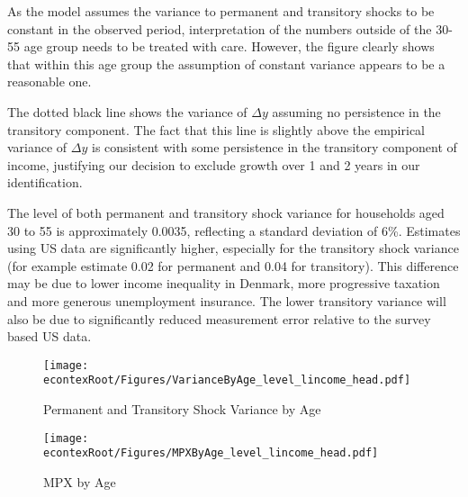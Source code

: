 \documentclass[titlepage]{\econtex}\newcommand{\texname}{ConsumptionHeterogeneity}
\begin{document}
As the model assumes the variance to permanent and transitory shocks to be constant in the observed period, interpretation of the numbers outside of the 30-55 age group needs to be treated with care. However, the figure clearly shows that within this age group the assumption of constant variance appears to be a reasonable one.

The dotted black line shows the variance of $\Delta y$ assuming no persistence in the transitory component. The fact that this line is slightly above the empirical variance of $\Delta y$ is consistent with some persistence in the transitory component of income, justifying our decision to exclude growth over 1 and 2 years in our identification.

The level of both permanent and transitory shock variance for households aged 30 to 55 is approximately 0.0035, reflecting a standard deviation of 6\%. Estimates using US data are significantly higher, especially for the transitory shock variance (for example \cite{carroll_nature_1997} estimate 0.02 for permanent and 0.04 for transitory). This difference may be due to lower income inequality in Denmark, more progressive taxation and more generous unemployment insurance. The lower transitory variance will also be due to significantly reduced measurement error relative to the survey based US data. 
\begin{figure} 
	\begin{centering}
		\texttt{[image: \\econtexRoot/Figures/VarianceByAge\_level\_lincome\_head.pdf]} 
		\caption{Permanent and Transitory Shock Variance by Age}
		\label{fig:VarianceByAge}
	\end{centering}
\end{figure}
\begin{figure} 
	\begin{centering}
		\texttt{[image: \\econtexRoot/Figures/MPXByAge\_level\_lincome\_head.pdf]} 
		\caption{MPX by Age}
		\label{fig:MPXByAge}
	\end{centering}
\end{figure}
\end{document}
